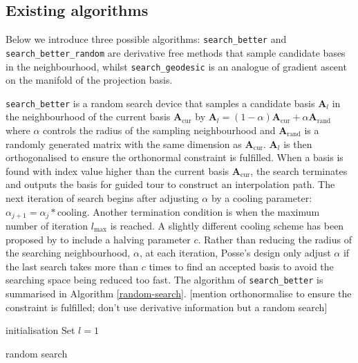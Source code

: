 \documentclass[12pt]{article}
\begin{document}
\hypertarget{existing-algorithms}{%
\subsection{Existing algorithms}\label{existing-algorithms}}

Below we introduce three possible algorithms: \texttt{search\_better} and \texttt{search\_better\_random} are derivative free methods that sample candidate bases in the neighbourhood, whilst \texttt{search\_geodesic} is an analogue of gradient ascent on the manifold of the projection basis.

\texttt{search\_better} is a random search device that samples a candidate basis \(\mathbf{A}_{l}\) in the neighbourhood of the current basis \(\mathbf{A}_{\text{cur}}\) by \(\mathbf{A}_{l} = (1- \alpha)\mathbf{A}_{\text{cur}} + \alpha \mathbf{A}_{\text{rand}}\) where \(\alpha\) controls the radius of the sampling neighbourhood and \(\mathbf{A}_{\text{rand}}\) is a randomly generated matrix with the same dimension as \(\mathbf{A}_{\text{cur}}\). \(\mathbf{A}_{l}\) is then orthogonalised to ensure the orthonormal constraint is fulfilled. When a basis is found with index value higher than the current basis \(\mathbf{A}_{\text{cur}}\), the search terminates and outputs the basis for guided tour to construct an interpolation path. The next iteration of search begins after adjusting \(\alpha\) by a cooling parameter: \(\alpha_{j+1} = \alpha_j * \text{cooling}\). Another termination condition is when the maximum number of iteration \(l_{\max}\) is reached. A slightly different cooling scheme has been proposed by \citet{posse1995projection} to include a halving parameter \(c\). Rather than reducing the radius of the searching neighbourhood, \(\alpha\), at each iteration, Posse's design only adjust \(\alpha\) if the last search takes more than \(c\) times to find an accepted basis to avoid the searching space being reduced too fast. The algorithm of \texttt{search\_better} is summarised in Algorithm \ref{random-search}. {[}mention orthonormalise to ensure the constraint is fulfilled; don't use derivative information but a random search{]}

\begin{algorithm}
\SetAlgoLined
  initialisation\;
  Set $l = 1$\;
  \caption{random search}
  \label{random-search}
\end{algorithm}
\end{document}
